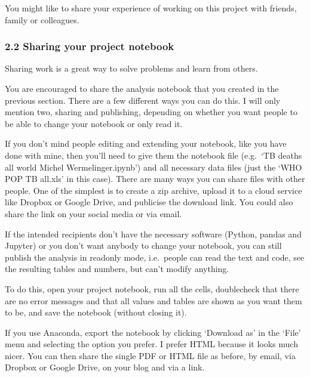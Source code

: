 \documentclass[letterpaper,10pt,english]{sphinxmanual}
\let\sphinxpxdimen\pdfpxdimen\else\newdimen\sphinxpxdimen
\begin{document}
You might like to share your experience of working on this project with friends, family or colleagues.


\subsubsection{2.2 Sharing your project notebook}
\label{\detokenize{content/session_02/Part_02_02:2.2-Sharing-your-project-notebook}}
\sphinxincludegraphics[width=512\sphinxpxdimen,height=341\sphinxpxdimen]{{ou_futurelearn_learn_to_code_fig_1037}.jpg}


Sharing work is a great way to solve problems and learn from others.

You are encouraged to share the analysis notebook that you created in the previous section. There are a few different ways you can do this. I will only mention two, sharing and publishing, depending on whether you want people to be able to change your notebook or only read it.

If you don’t mind people editing and extending your notebook, like you have done with mine, then you’ll need to give them the notebook file (e.g. ‘TB deaths all world \textendash{} Michel Wermelinger.ipynb’) and all necessary data files (just the ‘WHO POP TB all.xls’ in this case). There are many ways you can share files with other people. One of the simplest is to create a zip archive, upload it to a cloud service like Dropbox or Google Drive, and publicise the download link. You could also share the link
on your social media or via email.

If the intended recipients don’t have the necessary software (Python, pandas and Jupyter) or you don’t want anybody to change your notebook, you can still publish the analysis in read\sphinxhyphen{}only mode, i.e. people can read the text and code, see the resulting tables and numbers, but can’t modify anything.

To do this, open your project notebook, run all the cells, double\sphinxhyphen{}check that there are no error messages and that all values and tables are shown as you want them to be, and save the notebook (without closing it).

If you use Anaconda, export the notebook by clicking ‘Download as’ in the ‘File’ menu and selecting the option you prefer. I prefer HTML because it looks much nicer. You can then share the single PDF or HTML file as before, by email, via Dropbox or Google Drive, on your blog and via a link.
\end{document}
